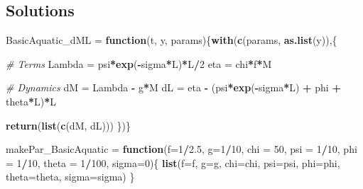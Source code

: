 \documentclass[
]{book}
\newenvironment{Shaded}{\begin{snugshade}}{\end{snugshade}}
\newcommand{\AttributeTok}[1]{\textcolor[rgb]{0.13,0.29,0.53}{#1}}
\newcommand{\CommentTok}[1]{\textcolor[rgb]{0.56,0.35,0.01}{\textit{#1}}}
\newcommand{\ControlFlowTok}[1]{\textcolor[rgb]{0.13,0.29,0.53}{\textbf{#1}}}
\newcommand{\DecValTok}[1]{\textcolor[rgb]{0.00,0.00,0.81}{#1}}
\newcommand{\FloatTok}[1]{\textcolor[rgb]{0.00,0.00,0.81}{#1}}
\newcommand{\FunctionTok}[1]{\textcolor[rgb]{0.13,0.29,0.53}{\textbf{#1}}}
\newcommand{\NormalTok}[1]{#1}
\newcommand{\OtherTok}[1]{\textcolor[rgb]{0.56,0.35,0.01}{#1}}
\newcommand{\SpecialCharTok}[1]{\textcolor[rgb]{0.81,0.36,0.00}{\textbf{#1}}}
\begin{document}
\hypertarget{solutions-1}{%
\subsection{Solutions}\label{solutions-1}}

\begin{Shaded}
\begin{Highlighting}[]
\NormalTok{BasicAquatic\_dML }\OtherTok{=} \ControlFlowTok{function}\NormalTok{(t, y, params)\{}\FunctionTok{with}\NormalTok{(}\FunctionTok{c}\NormalTok{(params, }\FunctionTok{as.list}\NormalTok{(y)),\{}
   
  \CommentTok{\# Terms }
\NormalTok{  Lambda }\OtherTok{=}\NormalTok{ psi}\SpecialCharTok{*}\FunctionTok{exp}\NormalTok{(}\SpecialCharTok{{-}}\NormalTok{sigma}\SpecialCharTok{*}\NormalTok{L)}\SpecialCharTok{*}\NormalTok{L}\SpecialCharTok{/}\DecValTok{2} 
\NormalTok{  eta }\OtherTok{=}\NormalTok{ chi}\SpecialCharTok{*}\NormalTok{f}\SpecialCharTok{*}\NormalTok{M }
   
  \CommentTok{\# Dynamics }
\NormalTok{  dM }\OtherTok{=}\NormalTok{ Lambda }\SpecialCharTok{{-}}\NormalTok{ g}\SpecialCharTok{*}\NormalTok{M}
\NormalTok{  dL }\OtherTok{=}\NormalTok{ eta }\SpecialCharTok{{-}}\NormalTok{ (psi}\SpecialCharTok{*}\FunctionTok{exp}\NormalTok{(}\SpecialCharTok{{-}}\NormalTok{sigma}\SpecialCharTok{*}\NormalTok{L) }\SpecialCharTok{+}\NormalTok{ phi }\SpecialCharTok{+}\NormalTok{ theta}\SpecialCharTok{*}\NormalTok{L)}\SpecialCharTok{*}\NormalTok{L }
  
  \FunctionTok{return}\NormalTok{(}\FunctionTok{list}\NormalTok{(}\FunctionTok{c}\NormalTok{(dM, dL)))}
\NormalTok{\})\} }
\end{Highlighting}
\end{Shaded}

\begin{Shaded}
\begin{Highlighting}[]
\NormalTok{makePar\_BasicAquatic }\OtherTok{=} \ControlFlowTok{function}\NormalTok{(}\AttributeTok{f=}\DecValTok{1}\SpecialCharTok{/}\FloatTok{2.5}\NormalTok{, }\AttributeTok{g=}\DecValTok{1}\SpecialCharTok{/}\DecValTok{10}\NormalTok{, }\AttributeTok{chi =} \DecValTok{50}\NormalTok{, }\AttributeTok{psi =} \DecValTok{1}\SpecialCharTok{/}\DecValTok{10}\NormalTok{, }\AttributeTok{phi =} \DecValTok{1}\SpecialCharTok{/}\DecValTok{10}\NormalTok{, }\AttributeTok{theta =} \DecValTok{1}\SpecialCharTok{/}\DecValTok{100}\NormalTok{, }\AttributeTok{sigma=}\DecValTok{0}\NormalTok{)\{}
  \FunctionTok{list}\NormalTok{(}\AttributeTok{f=}\NormalTok{f, }\AttributeTok{g=}\NormalTok{g, }\AttributeTok{chi=}\NormalTok{chi, }\AttributeTok{psi=}\NormalTok{psi, }\AttributeTok{phi=}\NormalTok{phi, }\AttributeTok{theta=}\NormalTok{theta, }\AttributeTok{sigma=}\NormalTok{sigma)}
\NormalTok{\}}
\end{Highlighting}
\end{Shaded}
\end{document}
